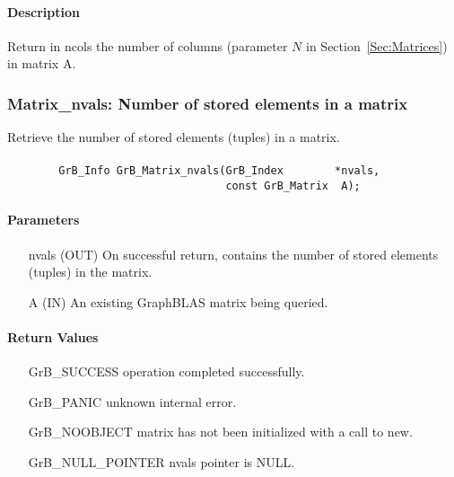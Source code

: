 \paragraph{Description}

Return in {\sf ncols} the number of columns (parameter $N$ in Section~\ref{Sec:Matrices}) in matrix {\sf A}.

\subsubsection{{\sf Matrix\_nvals}: Number of stored elements in a matrix}

Retrieve the number of stored elements (tuples) in a matrix.

\paragraph{\syntax}

\begin{verbatim}
        GrB_Info GrB_Matrix_nvals(GrB_Index        *nvals,
                                  const GrB_Matrix  A);
\end{verbatim}

\paragraph{Parameters}

\begin{itemize}[leftmargin=1.1in]
    \item[{\sf nvals}] ({\sf OUT}) On successful return, contains the number of 
    stored elements (tuples) in the matrix.
    \item[{\sf A}] ({\sf IN}) An existing GraphBLAS matrix being queried.
\end{itemize}

\paragraph{Return Values}

\begin{itemize}[leftmargin=2.1in]
\item[{\sf GrB\_SUCCESS}]   operation completed successfully.
\item[{\sf GrB\_PANIC}]     unknown internal error.
\item[{\sf GrB\_NOOBJECT}]  matrix has not been initialized with a call to {\sf new}.
\item[{\sf GrB\_NULL\_POINTER}]    {\sf nvals} pointer is {\sf NULL}.
\end{itemize}

